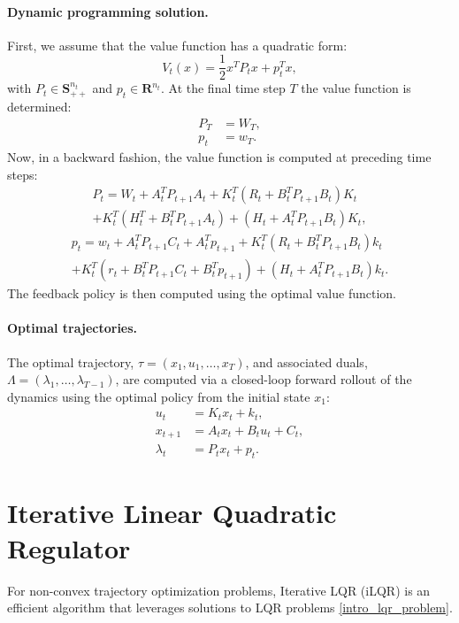 \paragraph{Dynamic programming solution.}
First, we assume that the value function has a quadratic form:
\begin{equation}
	V_t(x) = \frac{1}{2} x^T P_t x + p_t^T x,
\end{equation}
with $P_t \in \mathbf{S}_{++}^{n_t}$ and $p_t \in \mathbf{R}^{n_t}$. At the final time step $T$ the value function is determined:
\begin{align}
	P_T &= W_T, \\
	p_t &= w_T.
\end{align}
Now, in a backward fashion, the value function is computed at preceding time steps: 
\begin{multline}
	P_t = W_t + A_t^T P_{t+1} A_t + K_t^T (R_t + B_t^T P_{t+1} B_t) K_t \\
	+ K_t^T (H_t^T + B_t^T P_{t+1} A_t) + (H_t + A_t^T P_{t+1} B_t) K_t, \label{intro_cost_to_go_matrix}
\end{multline}
\begin{multline}
	p_t = w_t + A_t^T P_{t+1} C_t + A_t^T p_{t+1} + K_t^T (R_t + B_t^T P_{t+1} B_t) k_t \\
	+ K_t^T (r_t + B_t^T P_{t+1} C_t + B_t^T p_{t+1}) + (H_t + A_t^T P_{t+1} B_t) k_t. \label{intro_cost_to_go_vector}
\end{multline}
The feedback policy is then computed using the optimal value function.

\paragraph{Optimal trajectories.}
The optimal trajectory, $\tau = (x_1, u_1, \dots, x_T)$, and associated duals, $\Lambda = (\lambda_1, \dots, \lambda_{T-1})$, are computed via a closed-loop forward rollout of the dynamics using the optimal policy from the initial state $x_1$:
\begin{align}
	u_t &= K_t x_t + k_t, \\
	x_{t+1} &= A_t x_t + B_t u_t + C_t, \\
	\lambda_t &= P_t x_t + p_t.
\end{align}

\section{Iterative Linear Quadratic Regulator}
For non-convex trajectory optimization problems, Iterative LQR (iLQR) is an efficient algorithm that leverages solutions to LQR problems \eqref{intro_lqr_problem}.

